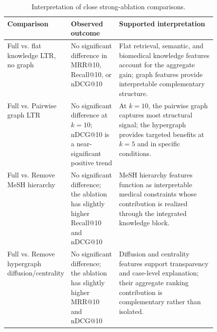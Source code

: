\begin{table}[t]
\centering
\small
\caption{Interpretation of close strong-ablation comparisons.}
\label{tab:strong-ablation-interpretation}
\begin{tabularx}{\linewidth}{p{0.27\linewidth}p{0.23\linewidth}X}
\toprule
Comparison & Observed outcome & Supported interpretation \\
\midrule
Full vs. flat knowledge LTR, no graph & No significant difference in MRR@10, Recall@10, or nDCG@10 & Flat retrieval, semantic, and biomedical knowledge features account for the aggregate gain; graph features provide interpretable complementary structure. \\
Full vs. Pairwise graph LTR & No significant difference at $k=10$; nDCG@10 is a near-significant positive trend & At $k=10$, the pairwise graph captures most structural signal; the hypergraph provides targeted benefits at $k=5$ and in specific conditions. \\
Full vs. Remove MeSH hierarchy & No significant difference; the ablation has slightly higher Recall@10 and nDCG@10 & MeSH hierarchy features function as interpretable medical constraints whose contribution is realized through the integrated knowledge block. \\
Full vs. Remove hypergraph diffusion/centrality & No significant difference; the ablation has slightly higher MRR@10 and nDCG@10 & Diffusion and centrality features support transparency and case-level explanation; their aggregate ranking contribution is complementary rather than isolated. \\
\bottomrule
\end{tabularx}
\end{table}
